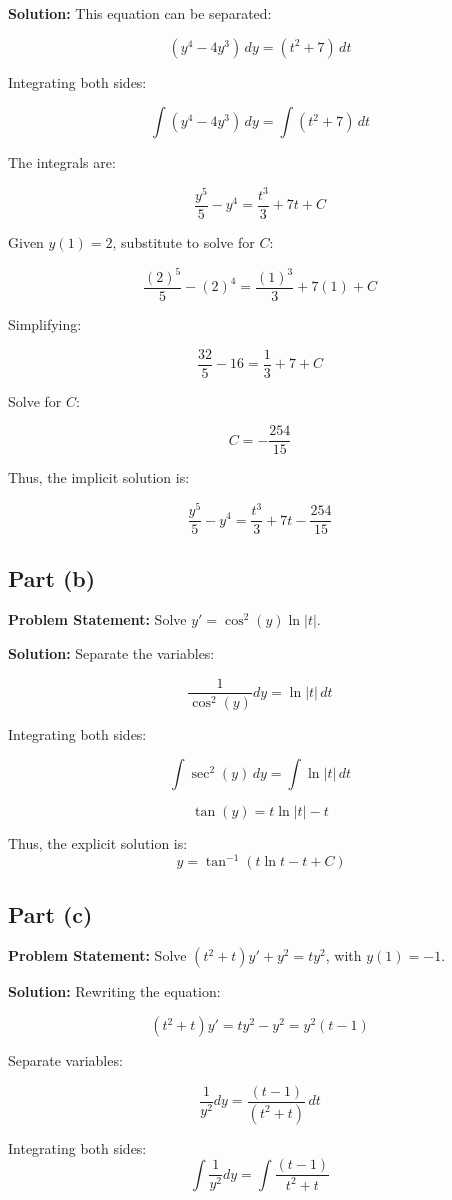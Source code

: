 \documentclass[12pt, letterpaper]{article}
\begin{document}
\textbf{Solution:}
This equation can be separated:

\[
(y^4 - 4y^3) \, dy = (t^2 + 7) \, dt
\]

Integrating both sides:

\[
\int (y^4 - 4y^3) \, dy = \int (t^2 + 7) \, dt
\]

The integrals are:

\[
\frac{y^5}{5} - y^4 = \frac{t^3}{3} + 7t + C
\]

Given \( y(1) = 2 \), substitute to solve for \( C \):

\[
\frac{(2)^5}{5} - (2)^4 = \frac{(1)^3}{3} + 7(1) + C
\]

Simplifying:

\[
\frac{32}{5} - 16 = \frac{1}{3} + 7 + C
\]

Solve for \( C \):

\[
    C = -\frac{254}{15}
\]

Thus, the implicit solution is:

\[
\frac{y^5}{5} - y^4 = \frac{t^3}{3} + 7t -\frac{254}{15}
\]

\subsection*{Part (b)}
\textbf{Problem Statement:} Solve \( y' = \cos^2(y) \ln|t| \).

\textbf{Solution:}
Separate the variables:

\[
\frac{1}{\cos^2(y)}dy = \ln|t| \, dt
\]

Integrating both sides:

\[
\int \sec^2(y) \, dy = \int \ln |t| \, dt
\]

\[
\tan(y) = t \ln|t| - t
\]

Thus, the explicit solution is:
\[
\ y = \tan^{-1}(t \ln t - t + C)
\]

\subsection*{Part (c)}
\textbf{Problem Statement:} Solve \( (t^2 + t) y' + y^2 = t y^2 \), with \( y(1) = -1 \).

\textbf{Solution:}
Rewriting the equation:

\[
(t^2 + t) y' = t y^{2} - y^{2} = y^{2} (t - 1)
\]

Separate variables:

\[
\frac{1}{y^{2}}dy = \frac{(t-1)}{(t^{2} + t)} \, dt
\]

Integrating both sides:
\[
\int \frac{1}{y^{2}}dy = \int \frac{(t-1)}{t^{2}+t}
\]
\end{document}
